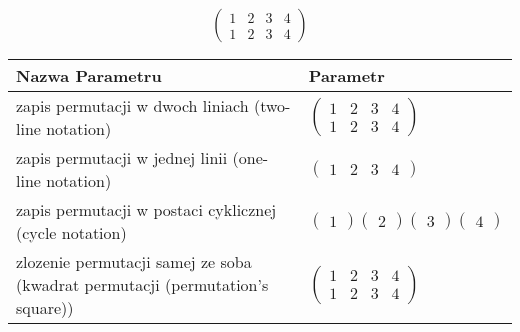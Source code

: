 \documentclass[12pt]{article}
\begin{document}
\subsection{}
\begin{center}
\[
\begin{pmatrix}
	1 & 2 & 3 & 4 \\ 
	1 & 2 & 3 & 4 
\end{pmatrix}
\]

\begin{tabular}{|m{0.6\linewidth}|m{0.4\linewidth}|}
	\hline
	Nazwa Parametru & Parametr \\
	\hline
	zapis permutacji w dwoch liniach (two-line notation) & $\begin{pmatrix} 1 & 2 & 3 & 4 \\ 
1 & 2 & 3 & 4 \end{pmatrix}$ \\ 
	\hline
	zapis permutacji w jednej linii (one-line notation) & $\begin{pmatrix} 1 & 2 & 3 & 4 \end{pmatrix}$ \\ 
	\hline
	zapis permutacji w postaci cyklicznej (cycle notation) & $\begin{pmatrix} 1 \end{pmatrix} \begin{pmatrix} 2 \end{pmatrix} \begin{pmatrix} 3 \end{pmatrix} \begin{pmatrix} 4 \end{pmatrix} $ \\ 
	\hline
	zlozenie permutacji samej ze soba (kwadrat permutacji (permutation's square)) & $\begin{pmatrix} 1 & 2 & 3 & 4 \\ 
1 & 2 & 3 & 4 \end{pmatrix}$ \\ 
	\hline
\end{tabular}
\end{center}
\end{document}
